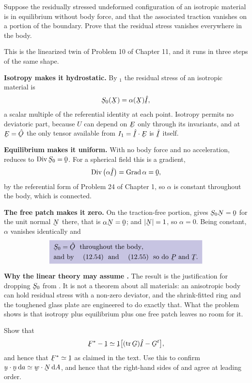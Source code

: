 \begin{problem}
Suppose the residually stressed undeformed configuration of an isotropic
material is in equilibrium without body force, and that the associated
traction vanishes on a portion of the boundary. Prove that the residual
stress vanishes everywhere in the body.
\end{problem}

\begin{solution}
This is the linearized twin of Problem 10 of Chapter 11, and it runs in
three steps of the same shape.

\textbf{Isotropy makes it hydrostatic.} By $_{1}$ the
residual stress of an isotropic material is
\[
   \bS_{0}(\bX)=\alpha(\bX)\hI ,
\]
a scalar multiple of the referential identity at each point. Isotropy
permits no deviatoric part, because $U$ can depend on $\bE$ only through
its invariants, and at $\bE=\hOb$ the only tensor available from
$I_{1}=\hI\cdot\bE$ is $\hI$ itself.

\textbf{Equilibrium makes it uniform.} With no body force and no
acceleration,  reduces to $\Dvg\bS_{0}=\bze$. For a spherical
field this is a gradient,
\[
   \Dvg\big(\alpha\hI\big)=\Grad\alpha=\bze ,
\]
by the referential form of Problem 24 of Chapter 1, so $\alpha$ is
constant throughout the body, which is connected.

\textbf{The free patch makes it zero.} On the traction-free portion,
 gives $\bS_{0}\bN=\bze$ for the unit normal $\bN$ there,
that is $\alpha\bN=\bze$; and $|\bN|=1$, so $\alpha=0$. Being constant,
$\alpha$ vanishes identically and
\[
   \boxed{\;
\begin{aligned}
   &\bS_{0}=\hOb\ \text{ throughout the body},\\
   &\text{and by \eqr{12.54} and \eqr{12.55} so do }\bP
   \text{ and }\bT .
\end{aligned}\;}
\]

\textbf{Why the linear theory may assume .} The result is the
justification for dropping $\bS_{0}$ from . It is not a
theorem about all materials: an anisotropic body can hold residual
stress with a non-zero deviator, and the shrink-fitted ring and the
toughened glass plate are engineered to do exactly that. What the
problem shows is that isotropy plus equilibrium plus one free patch
leaves no room for it.
\end{solution}

\begin{problem}
Show that
\[
   \bF^{*}-\shift\simeq\shift\big[(\tr\bG)\hI-\bG^{t}\big],
\]
and hence that $\bF^{*}\simeq\shift$ as claimed in the text. Use this to
confirm $\ip\bu\bn\,\dl a\simeq\ip\bw\bN\,\dl A$, and hence that the
right-hand sides of  and  agree at leading order.
\end{problem}

